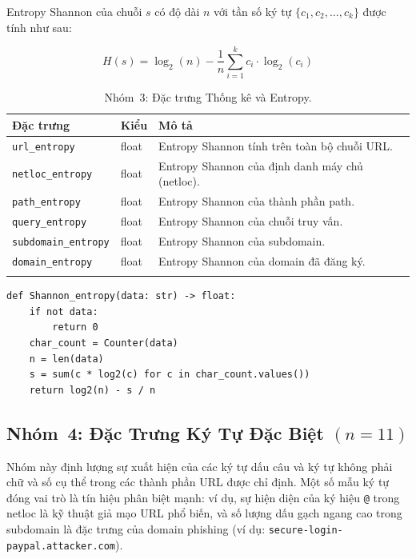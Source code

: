 \documentclass[a4paper,12pt]{article}
\begin{document}
Entropy Shannon của chuỗi $s$ có độ dài $n$ với tần số ký tự $\{c_1, c_2, \ldots, c_k\}$ được tính như sau:

\begin{equation}
H(s) = \log_2(n) - \frac{1}{n}\sum_{i=1}^{k} c_i \cdot \log_2(c_i)
\label{eq:entropy}
\end{equation}

\begin{longtable}{p{4.5cm}p{1.5cm}p{7cm}}
\toprule
\textbf{Đặc trưng} & \textbf{Kiểu} & \textbf{Mô tả} \\
\midrule
\endhead
\texttt{url\_entropy}       & float & Entropy Shannon tính trên toàn bộ chuỗi URL. \\
\texttt{netloc\_entropy}    & float & Entropy Shannon của định danh máy chủ (netloc). \\
\texttt{path\_entropy}      & float & Entropy Shannon của thành phần path. \\
\texttt{query\_entropy}     & float & Entropy Shannon của chuỗi truy vấn. \\
\texttt{subdomain\_entropy} & float & Entropy Shannon của subdomain. \\
\texttt{domain\_entropy}    & float & Entropy Shannon của domain đã đăng ký. \\
\bottomrule
\caption{Nhóm~3: Đặc trưng Thống kê và Entropy.}
\label{tab:entropy}
\end{longtable}

\begin{lstlisting}[caption={Cài đặt Entropy Shannon}]
def Shannon_entropy(data: str) -> float:
    if not data:
        return 0
    char_count = Counter(data)
    n = len(data)
    s = sum(c * log2(c) for c in char_count.values())
    return log2(n) - s / n
\end{lstlisting}

\subsection{Nhóm~4: Đặc Trưng Ký Tự Đặc Biệt \texorpdfstring{$(n=11)$}{(n=11)}}
\label{sec:feat_special}

Nhóm này định lượng sự xuất hiện của các ký tự dấu câu và ký tự không phải chữ và số cụ thể trong các thành phần URL được chỉ định. Một số mẫu ký tự đóng vai trò là tín hiệu phân biệt mạnh: ví dụ, sự hiện diện của ký hiệu \texttt{@} trong netloc là kỹ thuật giả mạo URL phổ biến, và số lượng dấu gạch ngang cao trong subdomain là đặc trưng của domain phishing (ví dụ: \texttt{secure-login-paypal.attacker.com}).
\end{document}
